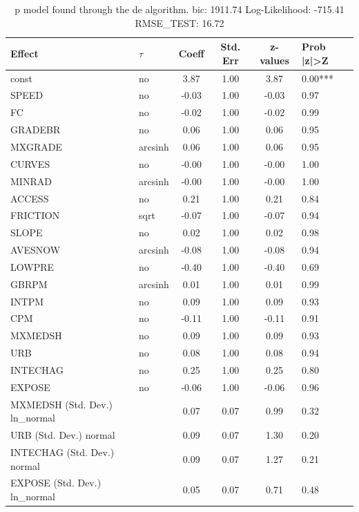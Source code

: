\begin{table}
	\caption{p model found through the de algorithm. bic: 1911.74 Log-Likelihood: -715.41 RMSE_TEST: 16.72}
	\begin{center}
		\begin{tabular}{|l|l|c|c|c|l|}
			\hline
			Effect & $\tau$ & Coeff & Std. Err & z-values & Prob |z|>Z \\
			\hline
			const & no & 3.87 & 1.00 & 3.87 & 0.00*** \\
			\hline
			SPEED & no & -0.03 & 1.00 & -0.03 & 0.97 \\
			\hline
			FC & no & -0.02 & 1.00 & -0.02 & 0.99 \\
			\hline
			GRADEBR & no & 0.06 & 1.00 & 0.06 & 0.95 \\
			\hline
			MXGRADE & arcsinh & 0.06 & 1.00 & 0.06 & 0.95 \\
			\hline
			CURVES & no & -0.00 & 1.00 & -0.00 & 1.00 \\
			\hline
			MINRAD & arcsinh & -0.00 & 1.00 & -0.00 & 1.00 \\
			\hline
			ACCESS & no & 0.21 & 1.00 & 0.21 & 0.84 \\
			\hline
			FRICTION & sqrt & -0.07 & 1.00 & -0.07 & 0.94 \\
			\hline
			SLOPE & no & 0.02 & 1.00 & 0.02 & 0.98 \\
			\hline
			AVESNOW & arcsinh & -0.08 & 1.00 & -0.08 & 0.94 \\
			\hline
			LOWPRE & no & -0.40 & 1.00 & -0.40 & 0.69 \\
			\hline
			GBRPM & arcsinh & 0.01 & 1.00 & 0.01 & 0.99 \\
			\hline
			INTPM & no & 0.09 & 1.00 & 0.09 & 0.93 \\
			\hline
			CPM & no & -0.11 & 1.00 & -0.11 & 0.91 \\
			\hline
			MXMEDSH & no & 0.09 & 1.00 & 0.09 & 0.93 \\
			\hline
			URB & no & 0.08 & 1.00 & 0.08 & 0.94 \\
			\hline
			INTECHAG & no & 0.25 & 1.00 & 0.25 & 0.80 \\
			\hline
			EXPOSE & no & -0.06 & 1.00 & -0.06 & 0.96 \\
			\hline
			MXMEDSH (Std. Dev.) ln_normal &  & 0.07 & 0.07 & 0.99 & 0.32 \\
			\hline
			URB (Std. Dev.) normal &  & 0.09 & 0.07 & 1.30 & 0.20 \\
			\hline
			INTECHAG (Std. Dev.) normal &  & 0.09 & 0.07 & 1.27 & 0.21 \\
			\hline
			EXPOSE (Std. Dev.) ln_normal &  & 0.05 & 0.07 & 0.71 & 0.48 \\
			\hline
		\end{tabular}
	\end{center}
\end{table}